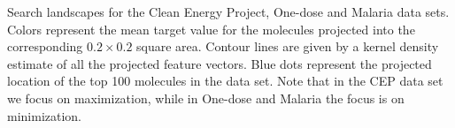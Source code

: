 Search landscapes for the Clean Energy Project, One-dose and Malaria data sets.  
Colors represent the mean target value for the molecules projected into the corresponding $0.2 \times 0.2$ square area. Contour lines are given by a kernel density estimate of all the projected feature vectors. Blue dots represent the projected location of the top 100 molecules in the data set. Note that in the CEP data set we focus on maximization, while in One-dose and Malaria the focus is on minimization.
\label{fig:info_landscapes}